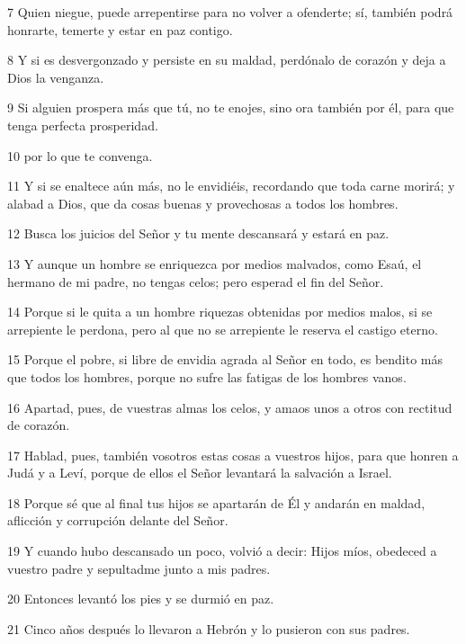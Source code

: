 \par 7 Quien niegue, puede arrepentirse para no volver a ofenderte; sí, también podrá honrarte, temerte y estar en paz contigo.

\par 8 Y si es desvergonzado y persiste en su maldad, perdónalo de corazón y deja a Dios la venganza.

\par 9 Si alguien prospera más que tú, no te enojes, sino ora también por él, para que tenga perfecta prosperidad.

\par 10 por lo que te convenga.

\par 11 Y si se enaltece aún más, no le envidiéis, recordando que toda carne morirá; y alabad a Dios, que da cosas buenas y provechosas a todos los hombres.

\par 12 Busca los juicios del Señor y tu mente descansará y estará en paz.

\par 13 Y aunque un hombre se enriquezca por medios malvados, como Esaú, el hermano de mi padre, no tengas celos; pero esperad el fin del Señor.

\par 14 Porque si le quita a un hombre riquezas obtenidas por medios malos, si se arrepiente le perdona, pero al que no se arrepiente le reserva el castigo eterno.

\par 15 Porque el pobre, si libre de envidia agrada al Señor en todo, es bendito más que todos los hombres, porque no sufre las fatigas de los hombres vanos.

\par 16 Apartad, pues, de vuestras almas los celos, y amaos unos a otros con rectitud de corazón.

\par 17 Hablad, pues, también vosotros estas cosas a vuestros hijos, para que honren a Judá y a Leví, porque de ellos el Señor levantará la salvación a Israel.

\par 18 Porque sé que al final tus hijos se apartarán de Él y andarán en maldad, aflicción y corrupción delante del Señor.

\par 19 Y cuando hubo descansado un poco, volvió a decir: Hijos míos, obedeced a vuestro padre y sepultadme junto a mis padres.

\par 20 Entonces levantó los pies y se durmió en paz.

\par 21 Cinco años después lo llevaron a Hebrón y lo pusieron con sus padres.



